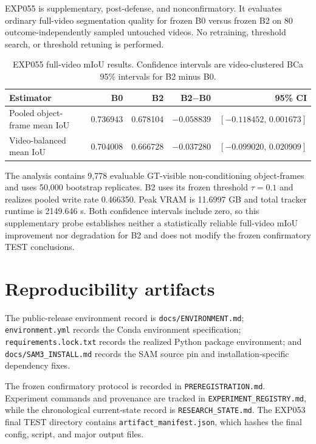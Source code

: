\documentclass[10pt,twocolumn,letterpaper]{article}
\begin{document}
EXP055 is supplementary, post-defense, and nonconfirmatory.  It evaluates
ordinary full-video segmentation quality for frozen B0 versus frozen B2 on
80 outcome-independently sampled untouched videos.  No retraining, threshold
search, or threshold retuning is performed.

\begin{table}[t]
\centering
\small
\caption{EXP055 full-video mIoU results.  Confidence intervals are
video-clustered BCa 95\% intervals for B2 minus B0.}
\label{tab:supp-exp055}
\begin{tabular}{lrrrr}
\toprule
Estimator & B0 & B2 & B2$-$B0 & 95\% CI \\
\midrule
Pooled object-frame mean IoU
  & 0.736943 & 0.678104 & $-0.058839$ & $[-0.118452,\,0.001673]$ \\
Video-balanced mean IoU
  & 0.704008 & 0.666728 & $-0.037280$ & $[-0.099020,\,0.020909]$ \\
\bottomrule
\end{tabular}
\end{table}

The analysis contains 9,778 evaluable GT-visible non-conditioning
object-frames and uses 50,000 bootstrap replicates.  B2 uses its frozen
threshold $\tau=0.1$ and realizes pooled write rate 0.466350.  Peak VRAM is
11.6997 GB and total tracker runtime is 2149.646 s.  Both confidence
intervals include zero, so this supplementary probe establishes neither a
statistically reliable full-video mIoU improvement nor degradation for B2
and does not modify the frozen confirmatory TEST conclusions.

\section{Reproducibility artifacts}
\label{sec:supp-repro}

The public-release environment record is
\texttt{docs/ENVIRONMENT.md}; \texttt{environment.yml} records the Conda
environment specification; \texttt{requirements.lock.txt} records the
realized Python package environment; and \texttt{docs/SAM3\_INSTALL.md}
records the SAM source pin and installation-specific dependency fixes.

The frozen confirmatory protocol is recorded in
\texttt{PREREGISTRATION.md}.  Experiment commands and provenance are tracked
in \texttt{EXPERIMENT\_REGISTRY.md}, while the chronological current-state
record is \texttt{RESEARCH\_STATE.md}.  The EXP053 final TEST directory
contains \texttt{artifact\_manifest.json}, which hashes the final config,
script, and major output files.
\end{document}
